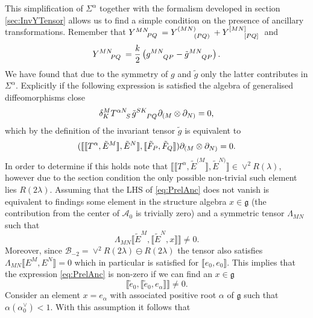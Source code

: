 This simplification of $\Sigma^\alpha$ together with the formalism developed in section \ref{sec:InvYTensor} allows us to find a simple condition on the presence of ancillary transformations. Remember that $\tensor{Y}{^{MN}_{PQ}}=\tensor{Y}{^{(MN)}_{(PQ)}}+\tensor{Y}{^{[MN]}_{[PQ]}}$ and 
\begin{equation}
    \tensor{Y}{^{MN}_{PQ}} = \frac{k}{2}\left(\tensor{g}{^{MN}_{QP}}-\tensor{\tilde{g}}{^{MN}_{QP}}\right).
\end{equation}
We have found that due to the symmetry of $g$ and $\tilde{g}$ only the latter contributes in $\Sigma^\alpha$. Explicitly if the following expression is satisfied the algebra of generalised diffeomorphisms close
\begin{equation}
    \delta^{M}_K\tensor{T}{^{\alpha N}_S}\tensor{\tilde{g}}{^{SK}_{PQ}}\pd_{(M}\otimes\pd_{N)} = 0,
\end{equation}
which by the definition of the invariant tensor $\tilde{g}$ is equivalent to 
\begin{equation}\label{eq:PrelAnc}
    (\llbracket \llbracket T^\alpha,\tilde{E}^{M}\rrbracket,\tilde{E}^N\rrbracket,\llbracket \tilde{F}_P,\tilde{F}_Q\rrbracket)\partial_{(M}\otimes\partial_{N)} = 0.
\end{equation}
In order to determine if this holds note that $\llbracket\llbracket T^\alpha ,\tilde{E}^{(M}\rrbracket,\tilde{E}^{N)}\rrbracket\in \vee^2R(\lambda)$, however due to the section condition the only possible non-trivial such element lies $R(2\lambda)$. Assuming that the LHS of \eqref{eq:PrelAnc} does not vanish is equivalent to findings some element in the structure algebra $x\in\mathfrak{g}$ (the contribution from the center of $\mathscr{A}_0$ is trivially zero) and a symmetric tensor $\Lambda_{MN}$ such that 
\begin{equation}
    \Lambda_{MN}\llbracket \tilde{E}^M,\llbracket\tilde{E}^N,x\rrbracket\rrbracket \neq 0.
\end{equation}
Moreover, since $\mathscr{B}_{-2}=\vee^2 R(2\lambda)\ominus R(2\lambda)$ the tensor also satisfies $\Lambda_{MN}\llbracket E^{M},E^N\rrbracket=0$ which in particular is satisfied for $\llbracket e_0,e_0\rrbracket$. This implies that the expression \eqref{eq:PrelAnc} is non-zero if we can find an $x\in\mathfrak{g}$ 
\begin{equation}
    \llbracket \tilde{e}_0,\llbracket\tilde{e}_0,e_\alpha\rrbracket\rrbracket \neq 0. 
\end{equation}
Consider an element $x=e_\alpha$ with associated positive root $\alpha$ of $\mathfrak{g}$ such that $\alpha(\alpha_0^\vee)< 1$. With this assumption it follows that 
